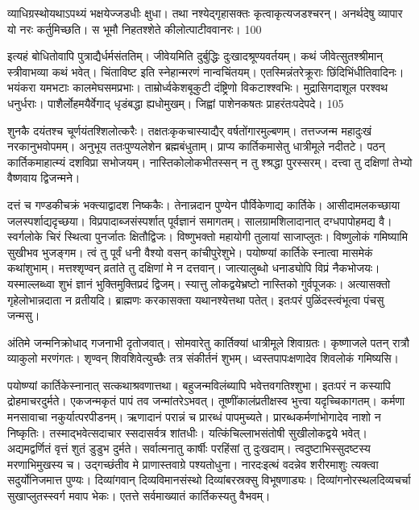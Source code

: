 व्याधिग्रस्थोयथाऽपथ्यं भक्षयेज्जडधीः क्षुधा।
तथा नश्येद्गृहासक्तः कृत्वाकृत्यजडश्चरन्।
अनर्थदेषु व्यापार यो नरः कर्तुमिच्छति।
स भूमौ निहतश्शेते कीलोत्पाटीववानरः।
100

इत्यहं बोधितोवापि पुत्राद्यैर्धर्मसंततिम्।
जीवेयमिति दुर्बुद्धिः दुःखादश्रूण्यवर्तयम्।
कथं जीवेत्सुतश्श्रीमान् स्त्रीवाभव्या कथं भवेत्।
चिंताविष्ट इति स्नेहान्मरणं नान्वचिंतयम्।
एतस्मिन्नंतरेक्रूराः छिंदिभिंधीतिवादिनः।
भयंकरा यमभटाः कालमेघसमप्रभाः।
ताम्रोर्ध्वकेशबूकुटी दंष्ट्रिणो विकटाश्श्वभिः।
मुद्रासिगदाशूल परश्वथ धनुर्धराः।
पाशैर्लोहमयैर्वेगाद् धृडंबद्धा ह्यधोमुखम्।
जिह्वां पाशेनकषतः प्राहरंतःपदेपदे।
105

शुनकै दयंतश्च चूर्णयंतश्शिलोत्करैः।
तक्षतःकृकचास्याद्यैर् वर्षतोंगारमुल्बणम्।
तत्तज्जन्म महादुःखं नरकानुभवोपमम्।
अनुभूय ततःपुण्यलेशेन ब्रह्मबंधुताम्।
प्राप्य कार्तिकमासेतु धात्रीमूले नदीतटे।
पठन् कार्तिकमाहात्म्यं दशविप्रा सभोजयम्।
नास्तिकोलोकभीतस्सन् न तु श्श्रद्धा पुरस्सरम्।
दत्त्वा तु दक्षिणां तेभ्यो वैष्णवाय द्विजन्मने।

दत्तं च गण्डकीचक्रं भक्त्याद्वादश निष्ककैः।
तेनान्नदान पुण्येन पौर्विकेणाद्य कार्तिके।
आसीदामलकच्छाया जलस्पर्शाद्यदृच्छया।
विप्रपादाब्जसंस्पर्शात् पूर्वज्ञानं समागतम्।
सालग्रामशिलादानात् दग्धपापोहमद्य वै।
स्वर्गलोके चिरं स्थित्वा पुनर्जातः क्षितौद्विजः।
विष्णुभक्तो महायोगी तुलायां साजाप्लुतः।
विष्णुलोकं गमिष्यामि सुखीभव भुजङ्गम।
त्वं तु पूर्वं धनी वैश्यो वसन् कांचीपुरेशुभे।
पयोष्ण्यां कार्तिके स्नात्वा मासमेकं कथांशुभाम्।
मत्तश्शृण्वन् व्रतांते तु दक्षिणां मे न दत्तवान्।
जात्यालुब्धो धनाड्योपि विप्रं नैकभोजयः।
यस्माल्लब्ध्वा शुभं ज्ञानं भुक्तिमुक्तिप्रदं द्विजम्।
स्यात्तु लोकद्वयेभ्रष्टो नास्तिको गुर्वपूजकः।
अत्यासक्तो गृहेलोभान्नदाता न व्रतीयदि।
ब्राह्मणः करकासक्ता यथानश्येत्तथा पतेत्।
इतःपरं पुळिंदस्त्वंभूत्वा पंचसु जन्मसु।

अंतिमे जन्मनिक्रोधाद् गजनाभी दृतोजवात्।
सोमवारेतु कार्तिक्यां धात्रीमूले शिवाग्रतः।
कृष्णाजले पतन् रात्रौ व्याकुलो मरणंगतः।
शृण्वन् शिवशिवेत्युच्छैः तत्र संकीर्तनं शुभम्।
ध्वस्तपापःक्षणादेव शिवलोकं गमिष्यसि।

पयोष्ण्यां कार्तिकेस्नानात् सत्कथाश्रवणात्तथा।
बहुजन्मविलंब्यापि भवेत्तवगतिश्शुभा।
इतःपरं न कस्यापि द्रोहमाचरदुर्मते।
एकजन्मकृतं पापं तव जन्मांतरेऽभवत्।
तूष्णींकालंप्रतीक्षस्व भुत्त्वा यदृच्चिकागतम्।
कर्मणा मनसावाचा नकुर्यात्परपीडनम्।
ऋणादानं परान्नं च प्रारब्धं पापमुच्यते।
प्रारब्धकर्मणांभोगादेव नाशो न निष्कृतिः।
तस्माद्भवेत्सदाचार स्सदासर्वत्र शांतधीः।
यत्किंचिल्लाभसंतोषी सुखीलोकद्वये भवेत्।
अद्यमद्वर्णितं वृत्तं शुतं डुडुभ दुर्मते।
सर्वात्मनातु कार्षीः परहिंसां तु दुःखदाम्।
त्वदुष्टाभिस्सुदष्टस्य मरणाभिमुखस्य च।
उद्गच्छंतीव मे प्राणास्तवाग्रे पश्यतोधुना।
नारदःइत्थं वदन्नेव शरीरमाशुः त्यक्त्वा
सदुर्योनिजमात्त पुण्यः।
दिव्यांगवान् दिव्यविमानसंस्थो
दिव्यांबरस्रक्सु विभूषणाड्यः।
दिव्यांगनोरस्थलदिव्यचर्चा
सुखाप्लुतस्स्वर्ग मवाप भेकः।
एतत्ते सर्वमाख्यातं कार्तिकस्यतु वैभवम्।

